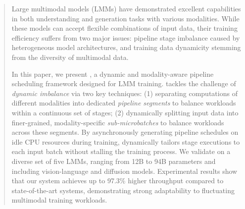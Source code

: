 \begin{abstract}

Large multimodal models (LMMs) have demonstrated excellent capabilities in both understanding and generation tasks with various modalities. While these models can accept flexible combinations of input data, their training efficiency suffers from two major issues: pipeline stage imbalance caused by heterogeneous model architectures, and training data dynamicity stemming from the diversity of multimodal data.

In this paper, we present \sys{}, a dynamic and modality-aware pipeline scheduling framework designed for LMM training. \sys{} tackles the challenge of \emph{dynamic imbalance} via two key techniques:
(1) separating computations of different modalities into dedicated \emph{pipeline segments} to balance workloads within a continuous set of stages;
(2) dynamically splitting input data into finer-grained, modality-specific \emph{sub-microbatches} to balance workloads across these segments.
By asynchronously generating pipeline schedules on idle CPU resources during training, \sys{} dynamically tailors stage executions to each input batch without stalling the training process.
We validate \sys{} on a diverse set of five LMMs, ranging from 12B to 94B parameters and including vision-language and diffusion models.
Experimental results show that our system achieves up to 97.3\% higher throughput compared to state-of-the-art systems,
demonstrating strong adaptability to fluctuating multimodal training workloads.

\end{abstract}
